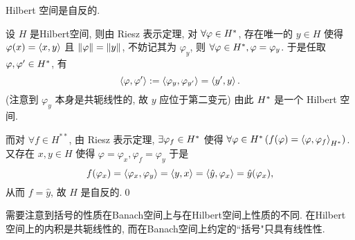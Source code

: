 	\begin{Proposition}
		Hilbert 空间是自反的.
	\end{Proposition}
	\begin{Proof}
		设 $ H $ 是Hilbert空间, 则由 Riesz 表示定理, 对 $ \forall \varphi\in H^{*} $, 存在唯一的 $ y\in H $ 使得 $ \varphi(x)=\left\langle x, y \right\rangle $ 且 $ \left\| \varphi \right\|=\left\| y \right\| $, 不妨记其为 $ \varphi_{y} $, 则 $ \forall \varphi\in H^{*}, \varphi=\varphi_{y} $. 于是任取 $ \varphi, \varphi'\in H^{*} $, 有
		\[
			\left\langle \varphi, \varphi' \right\rangle:=\left\langle \varphi_{y}, \varphi_{y'} \right\rangle=\left\langle y', y \right\rangle.
		\]
		(注意到 $ \varphi_{y} $ 本身是共轭线性的, 故 $ y $ 应位于第二变元) 由此 $ H^{*} $ 是一个 Hilbert 空间.

		而对 $ \forall f\in H^{**} $, 由 Riesz 表示定理, $ \exists\varphi_{f}\in H^{*} $ 使得 $ \forall \varphi\in H^{*}\,(f(\varphi)=\left\langle \varphi, \varphi_{f} \right\rangle_{H^{*}}) $. 又存在 $ x, y\in H $ 使得 $ \varphi=\varphi_{x}, \varphi_{f}=\varphi_{y} $ 于是
		\[
			f(\varphi_{x})=\left\langle \varphi_{x}, \varphi_{y} \right\rangle=\left\langle y, x \right\rangle=\left\langle \hat{y}, \varphi_{x} \right\rangle=\hat{y}(\varphi_{x}),
		\]
		从而 $ f=\hat{y} $, 故 $ H $ 是自反的.\qed
	\end{Proof}
	
	需要注意到括号的性质在Banach空间上与在Hilbert空间上性质的不同. 在Hilbert空间上的内积是共轭线性的, 而在Banach空间上约定的``括号"只具有线性性.
	
